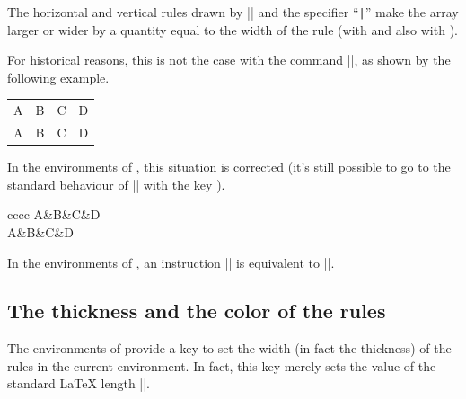 \documentclass[dvipsnames]{article}
\begin{document}
\label{remark-cline}

The horizontal and vertical rules drawn by |\hline| and the specifier
``\verb+|+'' make the array larger or wider by a quantity equal to the width
of the rule (with  and also with ).

\smallskip
For historical reasons, this is not the case with the command |\cline|, as
shown by the following example.

\medskip
\begin{Code}[width=10cm,show-output]
\setlength{\arrayrulewidth}{2pt}
\begin{tabular}{cccc} \hline
  A&B&C&D \\ \emph{\cline{2-2}}
  A&B&C&D \\ \hline
\end{tabular}
\end{Code}

\medskip
{}
In the environments of , this situation is corrected (it's
still possible to go to the standard behaviour of |\cline| with the key
). 

\medskip
\begin{Code}[width=10cm,show-output]
\setlength{\arrayrulewidth}{2pt}
\begin{NiceTabular}{cccc} \hline
  A&B&C&D \\ \emph{}
  A&B&C&D \\ \hline
\end{NiceTabular}
\end{Code}

\medskip
In the environments of , an instruction || 
is equivalent to ||.


\subsection{The thickness and the color of the rules}


The environments of  provide a key  to
set the width (in fact the thickness) of the rules in the current environment.
In fact, this key merely sets the value of the standard LaTeX length
|\arrayrulewidth|.
\end{document}
